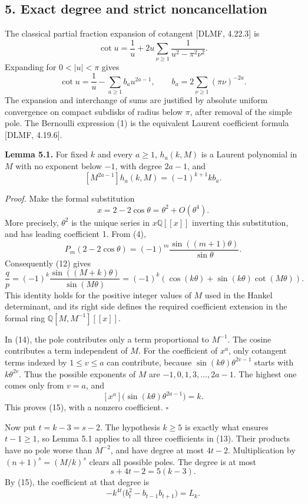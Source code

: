 \documentclass[
  11pt,
]{article}
\begin{document}
\subsection{5. Exact degree and strict
noncancellation}\label{exact-degree-and-strict-noncancellation}

The classical partial fraction expansion of cotangent {[}DLMF, 4.22.3{]}
is \[
 \cot u=\frac1u+2u\sum_{\nu\ge1}\frac1{u^2-\pi^2\nu^2}.
\] Expanding for \(0<|u|<\pi\) gives \[
 \cot u=\frac1u-\sum_{a\ge1}b_a u^{2a-1},\qquad
 b_a=2\sum_{\nu\ge1}(\pi\nu)^{-2a}.
 \tag{14}
\] The expansion and interchange of sums are justified by absolute
uniform convergence on compact subdisks of radius below \(\pi\), after
removal of the simple pole. The Bernoulli expression (1) is the
equivalent Laurent coefficient formula {[}DLMF, 4.19.6{]}.

\textbf{Lemma 5.1.} For fixed \(k\) and every \(a\ge1\), \(h_a(k,M)\) is
a Laurent polynomial in \(M\) with no exponent below \(-1\), with degree
\(2a-1\), and \[
 [M^{2a-1}]h_a(k,M)=(-1)^{k+1}k b_a.
 \tag{15}
\]

\emph{Proof.} Make the formal substitution \[
 x=2-2\cos\theta=\theta^2+O(\theta^4).
\] More precisely, \(\theta^2\) is the unique series in
\(x\mathbb Q[[x]]\) inverting this substitution, and has leading
coefficient 1. From (4), \[
 P_m(2-2\cos\theta)=(-1)^m
       \frac{\sin((m+1)\theta)}{\sin\theta}.
\] Consequently (12) gives \[
 \frac{q}{p}=(-1)^k\frac{\sin((M+k)\theta)}{\sin(M\theta)}
 =(-1)^k\left(\cos(k\theta)+\sin(k\theta)\cot(M\theta)\right).
 \tag{16}
\] This identity holds for the positive integer values of \(M\) used in
the Hankel determinant, and its right side defines the required
coefficient extension in the formal ring \(\mathbb Q[M,M^{-1}][[x]]\).

In (14), the pole contributes only a term proportional to \(M^{-1}\).
The cosine contributes a term independent of \(M\). For the coefficient
of \(x^a\), only cotangent terms indexed by \(1\le v\le a\) can
contribute, because \(\sin(k\theta)\theta^{2v-1}\) starts with
\(k\theta^{2v}\). Thus the possible exponents of \(M\) are
\(-1,0,1,3,\ldots,2a-1\). The highest one comes only from \(v=a\), and
\[
 [x^a]\bigl(\sin(k\theta)\theta^{2a-1}\bigr)=k.
\] This proves (15), with a nonzero coefficient. \(\square\)

Now put \(t=k-3=s-2\). The hypothesis \(k\ge5\) is exactly what ensures
\(t-1\ge1\), so Lemma 5.1 applies to all three coefficients in (13).
Their products have no pole worse than \(M^{-2}\), and have degree at
most \(4t-2\). Multiplication by \((n+1)^s=(M/k)^s\) clears all possible
poles. The degree is at most \[
 s+4t-2=5(k-3).
\] By (15), the coefficient at that degree is \[
 -k^{4t}\bigl(b_t^2-b_{t-1}b_{t+1}\bigr)=L_k.
\]
\end{document}

